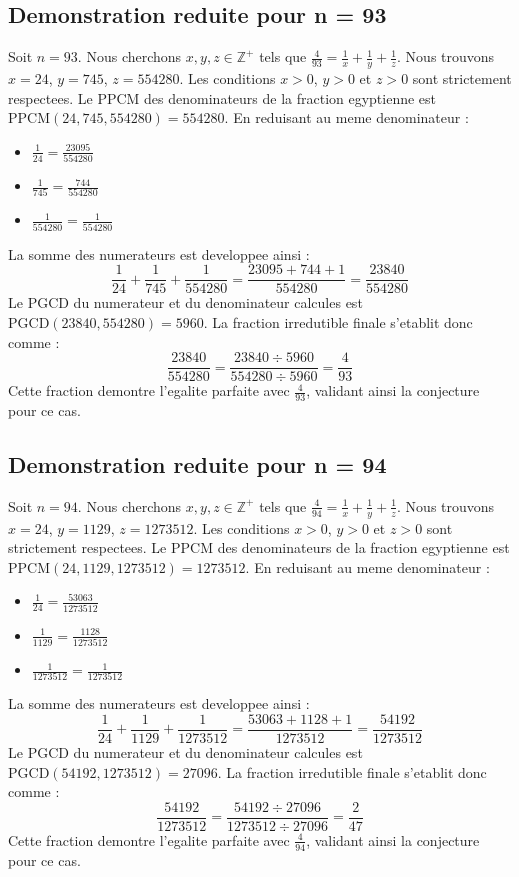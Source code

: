 \documentclass[11pt,a4paper]{article}
\begin{document}
\subsection{Demonstration reduite pour n = 93}
Soit $n = 93$. Nous cherchons $x, y, z \in \mathbb{Z}^{+}$ tels que $\frac{4}{93} = \frac{1}{x} + \frac{1}{y} + \frac{1}{z}$.
Nous trouvons $x = 24$, $y = 745$, $z = 554280$.
Les conditions $x > 0$, $y > 0$ et $z > 0$ sont strictement respectees.
Le PPCM des denominateurs de la fraction egyptienne est $\text{PPCM}(24, 745, 554280) = 554280$.
En reduisant au meme denominateur :
\begin{itemize}
    \item $\frac{1}{24} = \frac{23095}{554280}$
    \item $\frac{1}{745} = \frac{744}{554280}$
    \item $\frac{1}{554280} = \frac{1}{554280}$
\end{itemize}
La somme des numerateurs est developpee ainsi :
$$ \frac{1}{24} + \frac{1}{745} + \frac{1}{554280} = \frac{23095 + 744 + 1}{554280} = \frac{23840}{554280} $$
Le PGCD du numerateur et du denominateur calcules est $\text{PGCD}(23840, 554280) = 5960$.
La fraction irredutible finale s'etablit donc comme :
$$ \frac{23840}{554280} = \frac{23840 \div 5960}{554280 \div 5960} = \frac{4}{93} $$
Cette fraction demontre l'egalite parfaite avec $\frac{4}{93}$, validant ainsi la conjecture pour ce cas.

\subsection{Demonstration reduite pour n = 94}
Soit $n = 94$. Nous cherchons $x, y, z \in \mathbb{Z}^{+}$ tels que $\frac{4}{94} = \frac{1}{x} + \frac{1}{y} + \frac{1}{z}$.
Nous trouvons $x = 24$, $y = 1129$, $z = 1273512$.
Les conditions $x > 0$, $y > 0$ et $z > 0$ sont strictement respectees.
Le PPCM des denominateurs de la fraction egyptienne est $\text{PPCM}(24, 1129, 1273512) = 1273512$.
En reduisant au meme denominateur :
\begin{itemize}
    \item $\frac{1}{24} = \frac{53063}{1273512}$
    \item $\frac{1}{1129} = \frac{1128}{1273512}$
    \item $\frac{1}{1273512} = \frac{1}{1273512}$
\end{itemize}
La somme des numerateurs est developpee ainsi :
$$ \frac{1}{24} + \frac{1}{1129} + \frac{1}{1273512} = \frac{53063 + 1128 + 1}{1273512} = \frac{54192}{1273512} $$
Le PGCD du numerateur et du denominateur calcules est $\text{PGCD}(54192, 1273512) = 27096$.
La fraction irredutible finale s'etablit donc comme :
$$ \frac{54192}{1273512} = \frac{54192 \div 27096}{1273512 \div 27096} = \frac{2}{47} $$
Cette fraction demontre l'egalite parfaite avec $\frac{4}{94}$, validant ainsi la conjecture pour ce cas.
\end{document}
